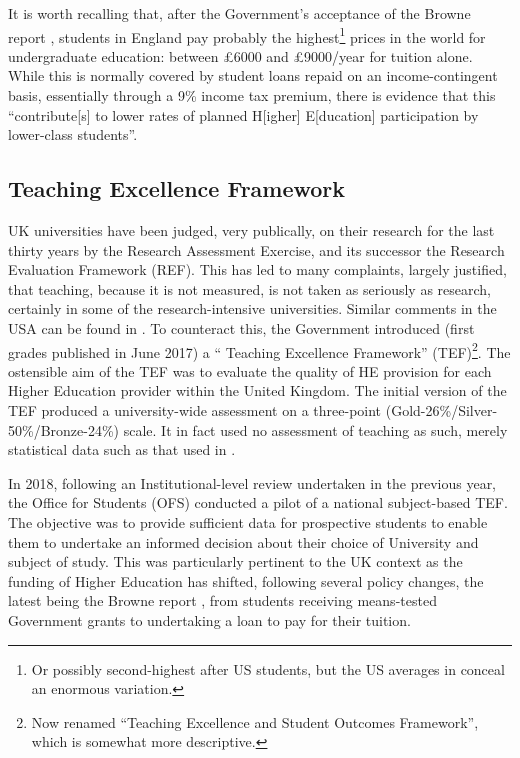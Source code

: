 \documentclass[sigconf]{acmart}
\begin{document}
It is worth recalling that, after the Government's acceptance of the
Browne report \cite{BIS2010a}, students in England pay probably the
highest\footnote{Or possibly second-highest after US students, but the
US averages in \cite[Table B5.1]{OECD2016a} conceal an enormous
variation.} prices in the world for undergraduate education: between
\pounds6000 and \pounds9000/year for tuition alone. While this is
normally covered by student loans repaid on an income-contingent
basis, essentially through a 9\% income tax premium, there is evidence
\cite{CallenderMason2017a} that this ``contribute[s] to lower rates of
planned H[igher] E[ducation] participation by lower-class students''.

\subsection{Teaching Excellence Framework}

UK universities have been judged, very publically, on their research for the last thirty years by the Research Assessment Exercise, and its successor the Research Evaluation Framework (REF). This has led to many complaints, largely justified, that teaching, because it is not measured, is not taken as seriously as research, certainly in some of the research-intensive universities. Similar comments in the USA can be found in \cite{Campbelletal2018a}. To counteract this, the Government introduced (first grades published in June 2017) a `` Teaching Excellence Framework'' (TEF)\footnote{Now renamed ``Teaching Excellence and Student Outcomes Framework'', which is somewhat more descriptive.}. The ostensible aim of the TEF was to evaluate the quality of HE provision for each Higher Education provider within the United Kingdom.
The initial version of the TEF produced a university-wide assessment on a three-point (Gold-26\%/Silver-50\%/Bronze-24\%) scale. It in fact used no assessment of teaching as such, merely statistical data such as that used in \cite{Shadbolt2016a}.

In 2018, following an Institutional-level review undertaken in the previous year, the Office for Students (OFS) conducted a pilot of a national  subject-based TEF. The objective was to provide sufficient data for prospective students to enable them to undertake an informed decision about their choice of University and subject of study. This was particularly pertinent to the UK context as the funding of Higher Education has shifted, following several policy changes, the latest being the
Browne report \cite{BIS2010a}, from students receiving means-tested Government grants to undertaking a loan to pay for their tuition. %
\end{document}
